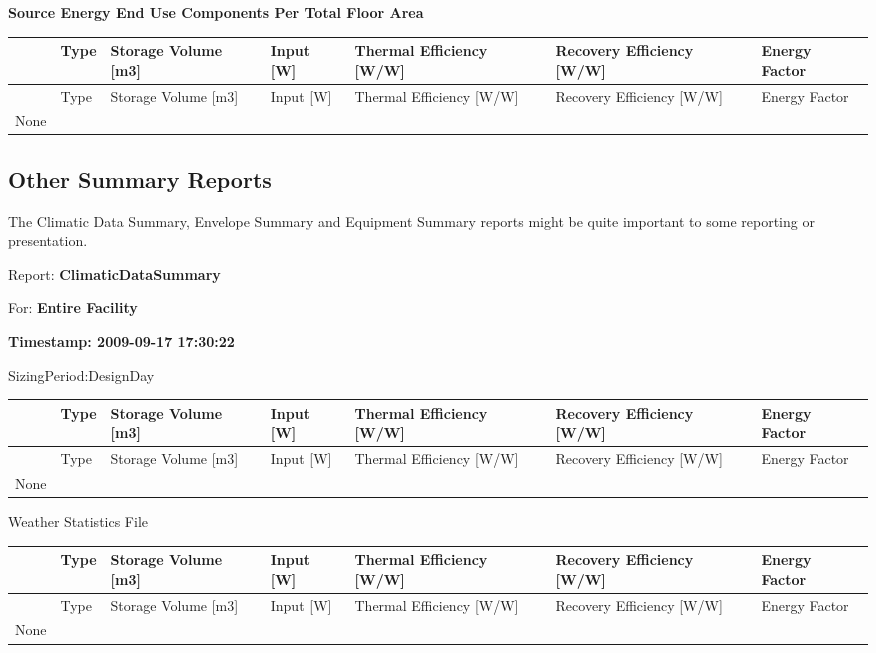 \textbf{Source Energy End Use Components Per Total Floor Area}

\begin{longtable}[c]{p{0.85in}p{0.85in}p{0.85in}p{0.85in}p{0.85in}p{0.85in}p{0.85in}}
\toprule 
~ & Type & Storage Volume [m3] & Input [W] & Thermal Efficiency [W/W] & Recovery Efficiency [W/W] & Energy Factor \tabularnewline
\midrule
\endfirsthead

\toprule 
~ & Type & Storage Volume [m3] & Input [W] & Thermal Efficiency [W/W] & Recovery Efficiency [W/W] & Energy Factor \tabularnewline
\midrule
\endhead

None & ~ & ~ & ~ & ~ & ~ & ~ \tabularnewline
\bottomrule
\end{longtable}

\subsection{Other Summary Reports}\label{other-summary-reports}

The Climatic Data Summary, Envelope Summary and Equipment Summary reports might be quite important to some reporting or presentation.

Report: \textbf{ClimaticDataSummary}

For: \textbf{Entire Facility}

\textbf{Timestamp: 2009-09-17 17:30:22}

SizingPeriod:DesignDay

\begin{longtable}[c]{p{0.85in}p{0.85in}p{0.85in}p{0.85in}p{0.85in}p{0.85in}p{0.85in}}
\toprule 
~ & Type & Storage Volume [m3] & Input [W] & Thermal Efficiency [W/W] & Recovery Efficiency [W/W] & Energy Factor \tabularnewline
\midrule
\endfirsthead

\toprule 
~ & Type & Storage Volume [m3] & Input [W] & Thermal Efficiency [W/W] & Recovery Efficiency [W/W] & Energy Factor \tabularnewline
\midrule
\endhead

None & ~ & ~ & ~ & ~ & ~ & ~ \tabularnewline
\bottomrule
\end{longtable}

Weather Statistics File

\begin{longtable}[c]{p{0.85in}p{0.85in}p{0.85in}p{0.85in}p{0.85in}p{0.85in}p{0.85in}}
\toprule 
~ & Type & Storage Volume [m3] & Input [W] & Thermal Efficiency [W/W] & Recovery Efficiency [W/W] & Energy Factor \tabularnewline
\midrule
\endfirsthead

\toprule 
~ & Type & Storage Volume [m3] & Input [W] & Thermal Efficiency [W/W] & Recovery Efficiency [W/W] & Energy Factor \tabularnewline
\midrule
\endhead

None & ~ & ~ & ~ & ~ & ~ & ~ \tabularnewline
\bottomrule
\end{longtable}


